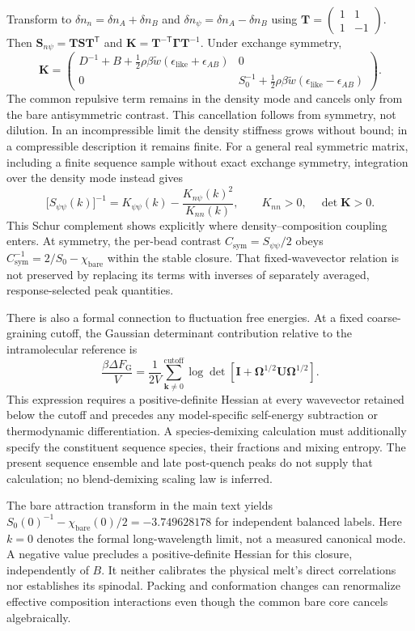 \documentclass[pdflatex,sn-nature,onecolumn]{sn-jnl}
\begin{document}
Transform to $\delta n_n=\delta n_A+\delta n_B$ and $\delta n_\psi=\delta n_A-\delta n_B$ using $\mathbf T=\left(\begin{smallmatrix}1&1\\1&-1\end{smallmatrix}\right)$. Then $\mathbf S_{n\psi}=\mathbf T\mathbf S\mathbf T^{\mathsf T}$ and $\mathbf K=\mathbf T^{-\mathsf T}\boldsymbol\Gamma\mathbf T^{-1}$. Under exchange symmetry,
\[
\mathbf K=
\begin{pmatrix}
 D^{-1}+B+\tfrac12\rho\beta\widetilde w(\epsilon_{\mathrm{like}}+\epsilon_{AB})&0\\
 0&S_0^{-1}+\tfrac12\rho\beta\widetilde w(\epsilon_{\mathrm{like}}-\epsilon_{AB})
\end{pmatrix}.
\]
The common repulsive term remains in the density mode and cancels only from the bare antisymmetric contrast. This cancellation follows from symmetry, not dilution. In an incompressible limit the density stiffness grows without bound; in a compressible description it remains finite. For a general real symmetric matrix, including a finite sequence sample without exact exchange symmetry, integration over the density mode instead gives
\[
\bigl[S_{\psi\psi}(k)\bigr]^{-1}
 =K_{\psi\psi}(k)-\frac{K_{n\psi}(k)^2}{K_{nn}(k)},
\qquad K_{nn}>0,\quad \det\mathbf K>0.
\]
This Schur complement shows explicitly where density--composition coupling enters. At symmetry, the per-bead contrast $C_{\mathrm{sym}}=S_{\psi\psi}/2$ obeys $C_{\mathrm{sym}}^{-1}=2/S_0-\chi_{\mathrm{bare}}$ within the stable closure. That fixed-wavevector relation is not preserved by replacing its terms with inverses of separately averaged, response-selected peak quantities.

There is also a formal connection to fluctuation free energies. At a fixed coarse-graining cutoff, the Gaussian determinant contribution relative to the intramolecular reference is
\[
\frac{\beta\Delta F_{\mathrm G}}V
 =\frac1{2V}\sum_{\bm k\ne0}^{\mathrm{cutoff}}
 \log\det\!\left[\mathbf I+
 \boldsymbol\Omega^{1/2}\mathbf U\boldsymbol\Omega^{1/2}\right].
\]
This expression requires a positive-definite Hessian at every wavevector retained below the cutoff and precedes any model-specific self-energy subtraction or thermodynamic differentiation. A species-demixing calculation must additionally specify the constituent sequence species, their fractions and mixing entropy. The present sequence ensemble and late post-quench peaks do not supply that calculation; no blend-demixing scaling law is inferred.

The bare attraction transform in the main text yields $S_0(0)^{-1}-\chi_{\mathrm{bare}}(0)/2=-3.749628178$ for independent balanced labels. Here $k=0$ denotes the formal long-wavelength limit, not a measured canonical mode. A negative value precludes a positive-definite Hessian for this closure, independently of $B$. It neither calibrates the physical melt's direct correlations nor establishes its spinodal. Packing and conformation changes can renormalize effective composition interactions even though the common bare core cancels algebraically.
\end{document}
